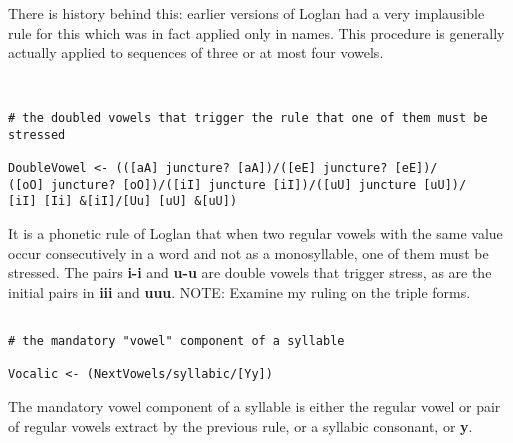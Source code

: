 \documentclass{article}
\begin{document}
There is history behind this:  earlier versions of Loglan had a very implausible rule for this which was in fact applied only in names.  This procedure is generally actually applied to sequences of three or at most four vowels.


\begin{verbatim}


# the doubled vowels that trigger the rule that one of them must be stressed

DoubleVowel <- (([aA] juncture? [aA])/([eE] juncture? [eE])/
([oO] juncture? [oO])/([iI] juncture [iI])/([uU] juncture [uU])/
[iI] [Ii] &[iI]/[Uu] [uU] &[uU])

\end{verbatim}

It is a phonetic rule of Loglan that when two regular vowels with the same value occur consecutively in a word and not as a monosyllable, one of them must be stressed.
The pairs {\bf i-i} and {\bf u-u} are double vowels that trigger stress, as are the initial pairs in {\bf iii} and {\bf uuu}.  NOTE:  Examine my ruling on the triple forms.

\begin{verbatim}

# the mandatory "vowel" component of a syllable

Vocalic <- (NextVowels/syllabic/[Yy])

\end{verbatim}

The mandatory vowel component of a syllable is either the regular vowel or pair of regular vowels extract by the previous rule, or a syllabic consonant, or {\bf y}.
\end{document}
